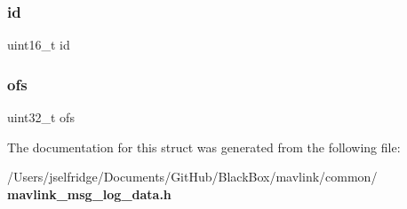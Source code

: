 \subsubsection{id}
{\footnotesize\ttfamily uint16\+\_\+t id}

\mbox{\label{struct____mavlink__log__data__t_aee7ed0e17982ee4d3f13c0d413d1f93f}} 
\subsubsection{ofs}
{\footnotesize\ttfamily uint32\+\_\+t ofs}



The documentation for this struct was generated from the following file\+:\begin{DoxyCompactItemize}
\item 
/\+Users/jselfridge/\+Documents/\+Git\+Hub/\+Black\+Box/mavlink/common/\textbf{ mavlink\+\_\+msg\+\_\+log\+\_\+data.\+h}\end{DoxyCompactItemize}
